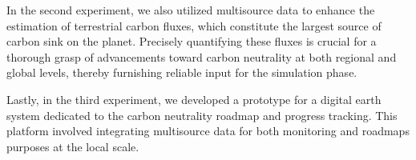 In the second experiment, we also utilized multisource data to enhance the estimation of terrestrial carbon fluxes, which constitute the largest source of carbon sink on the planet. Precisely quantifying these fluxes is crucial for a thorough grasp of advancements toward carbon neutrality at both regional and global levels, thereby furnishing reliable input for the simulation phase. \par

Lastly, in the third experiment, we developed a prototype for a digital earth system dedicated to the carbon neutrality roadmap and progress tracking. This platform involved integrating multisource data for both monitoring and roadmaps purposes at the local scale. \par



